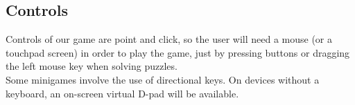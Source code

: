 \subsection{Controls}
Controls of our game are point and click, so the user will need a mouse (or a touchpad screen) in order to play the game, just by pressing buttons or dragging the left mouse key when solving puzzles.\\
Some minigames involve the use of directional keys. On devices without a keyboard, an on-screen virtual D-pad will be available.





